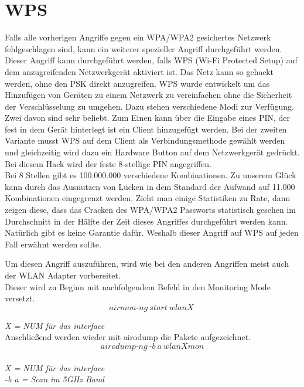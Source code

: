 \section{WPS}

Falls alle vorherigen Angriffe gegen ein WPA/WPA2 gesichertes Netzwerk fehlgeschlagen sind, kann ein weiterer spezieller Angriff durchgeführt werden. Dieser Angriff kann durchgeführt werden, falls WPS (Wi-Fi Protected Setup) auf dem anzugreifenden Netzwerkgerät aktiviert ist. Das Netz kann so gehackt werden, ohne den PSK direkt anzugreifen. WPS wurde entwickelt um das Hinzufügen von Geräten zu einem Netzwerk zu vereinfachen ohne die Sicherheit der Verschlüsselung zu umgehen. Dazu stehen verschiedene Modi zur Verfügung. Zwei davon sind sehr beliebt. Zum Einen kann über die Eingabe eines PIN, der fest in dem Gerät hinterlegt ist ein Client hinzugefügt werden. Bei der zweiten Variante musst WPS auf dem Client als Verbindungsmethode gewählt werden und gleichzeitig wird dazu ein Hardware Button auf dem Netzwerkgerät gedrückt. Bei diesem Hack wird der feste 8-stellige PIN angegriffen. \\

Bei 8 Stellen gibt es 100.000.000 verschiedene Kombinationen. Zu unserem Glück kann durch das Ausnutzen von Lücken in dem Standard der Aufwand auf 11.000 Kombinationen eingegrenzt werden. Zieht man einige Statistiken zu Rate, dann zeigen diese, dass das Cracken des WPA/WPA2 Passworts statistisch gesehen im Durchschnitt in der Hälfte der Zeit dieses Angriffes durchgeführt werden kann. Natürlich gibt es keine Garantie dafür. Weshalb dieser Angriff auf WPS auf jeden Fall erwähnt werden sollte. 

Um diesen Angriff auszuführen, wird wie bei den anderen Angriffen meist auch der WLAN Adapter vorbereitet.\\

Dieser wird zu Beginn mit nachfolgendem Befehl in den Monitoring Mode versetzt.\\

$$airmon\text{-}ng~start~wlanX~$$

\textit{X = NUM für das interface}\\


Anschließend werden wieder mit airodump die Pakete aufgezeichnet. \\

$$airodump\text{-}ng~\text{-}b~a~wlanXmon$$\\
	 
	\textit{X = NUM für das interface}\\
	\textit{-b a = Scan im 5GHz Band}\\	

